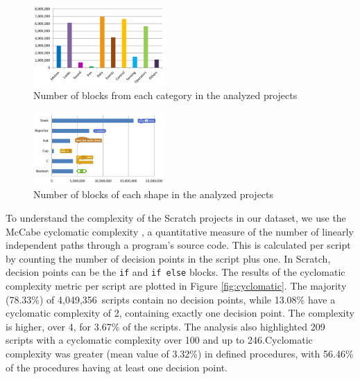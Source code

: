 \documentclass{sig-alternate}
\newcommand{\nscripts}{4,049,356}
\begin{document}
\begin{figure}
	\centering
	\includegraphics[width=0.45\textwidth]{fig/charts/16Categories}
	\caption{Number of blocks from each category in the analyzed projects}
	\label{fig:categories}
\end{figure}
\begin{figure}
	\centering
	\includegraphics[width=0.45\textwidth]{fig/charts/16Shapes}
	\caption{Number of blocks of each shape in the analyzed projects}
	\label{fig:shapes}
\end{figure}

To understand the complexity of the Scratch projects in our dataset, we use the McCabe cyclomatic complexity \cite{mcCabe76},  a quantitative measure of the number of linearly independent paths through a program's source code. This is calculated per script by counting the number of decision points in the script plus one. In Scratch, decision points can be the \texttt{if} and \texttt{if else} blocks. The results of the cyclomatic complexity metric per script are plotted in Figure \ref{fig:cyclomatic}. The majority (78.33\%) of \nscripts~scripts contain no decision points, while 13.08\% have a cyclomatic complexity of 2, containing exactly one decision point. The complexity is higher, over 4, for 3.67\% of the scripts. The analysis also highlighted 209 scripts with a cyclomatic complexity over 100 and up to 246.\footnotemark[\ref{repo}] Cyclomatic complexity was greater (mean value of 3.32\%) in defined procedures, with 56.46\% of the procedures having at least one decision point.

\noindent
{}
\end{document}
